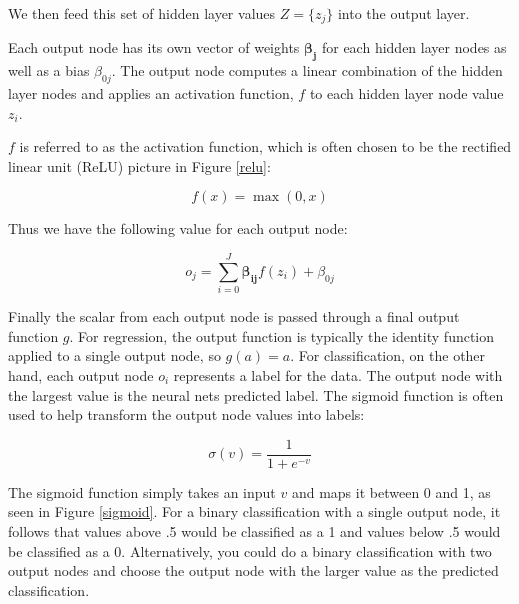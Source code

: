 \documentclass[12pt]{article}
\begin{document}
We then feed this set of hidden layer values $Z = \{z_j\}$ into the output layer.

Each output node has its own vector of weights $\boldsymbol{\beta_j}$ for each hidden layer nodes as well as a bias $\beta_{0j}$. The output node computes a linear combination of the hidden layer nodes and applies an activation function, $f$ to each hidden layer node value $z_i$.

$f$ is referred to as the activation function, which is often chosen to be the rectified linear unit (ReLU) picture in Figure \ref{relu}:

$$f(x) = \max(0,x)$$

Thus we have the following value for each output node: 

$$o_j = \sum_{i=0}^{J} \boldsymbol{\beta_{ij}} f(z_i) + \beta_{0j}$$

Finally the scalar from each output node is passed through a final output function $g$. For regression, the output function is typically the identity function applied to a single output node, so $g(a) = a$. \cite[350-351]{springer} For classification, on the other hand, each output node $o_i$ represents a label for the data. The output node with the largest value is the neural nets predicted label. The sigmoid function is often used to help transform the output node values into labels:

$$\sigma(v) = \frac{1}{1+e^{-v}}$$

The sigmoid function simply takes an input $v$ and maps it between 0 and 1, as seen in Figure \ref{sigmoid}. For a binary classification with a single output node, it follows that values above .5 would be classified as a 1 and values below .5 would be classified as a 0. Alternatively, you could do a binary classification with two output nodes and choose the output node with the larger value as the predicted classification.
\end{document}
